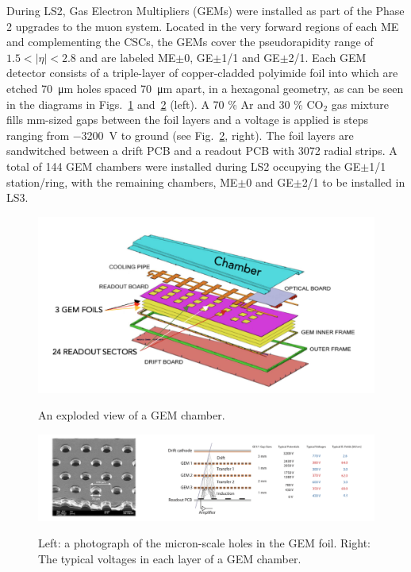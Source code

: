During LS2, Gas Electron Multipliers (GEMs) \cite{GEM} were installed as part of the Phase 2 upgrades to the muon system. Located in the very forward regions of each ME and complementing the CSCs, the GEMs cover the pseudorapidity range of $1.5<|\eta|<2.8$ and are labeled ME$\pm$0, GE$\pm$1/1 and GE$\pm$2/1. Each GEM detector consists of a triple-layer of copper-cladded polyimide foil into which are etched \SI{70}{\micro \meter} holes spaced \SI{70}{\micro\meter} apart, in a hexagonal geometry, as can be seen in the diagrams in Figs.~\ref{fig:GEMDiagram} and~\ref{fig:GEMDiagram2} (left). A 70 \% Ar and 30 \% CO$_2$ gas mixture fills mm-sized gaps between the foil layers and a voltage is applied is steps ranging from \SI{-3200}{V} to ground (see Fig.~\ref{fig:GEMDiagram2}, right). The foil layers are sandwitched between a drift PCB and a readout PCB with 3072 radial strips. A total of 144 GEM chambers were installed during LS2 occupying the GE$\pm$1/1 station/ring, with the remaining chambers, ME$\pm$0 and GE$\pm$2/1 to be installed in LS3. 

\begin{figure}[H]
    \centering
    {\includegraphics[width=\textwidth]{Images/CMS/GEMDiagram.png}}
    \caption{An exploded view of a GEM chamber.}
    \label{fig:GEMDiagram}
\end{figure}

\begin{figure}[H]
    \centering
    {\includegraphics[width=\textwidth]{Images/CMS/GEMDiagram2.png}}
    \caption{Left: a photograph of the micron-scale holes in the GEM foil. Right: The typical voltages in each layer of a GEM chamber.}
    \label{fig:GEMDiagram2}
\end{figure}